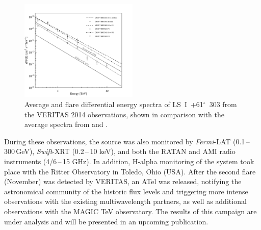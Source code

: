 \documentclass[preprint2]{aastex}
\newcommand{\lsi}{LS~I~+61$^{\circ}$~303}
\newcommand{\gev}{\,GeV}
\begin{document}
\begin{figure}[ht]
\centering
\includegraphics[width=0.5\textwidth]{figs/all_spectra_ED.pdf}
\caption{Average and flare differential energy spectra of \lsi{} from the VERITAS 2014 observations, shown in comparison with the average spectra from \citet{VERITASLSIDetection} and \citet{Aleksic}.}
\label{spec}
\end{figure}

During these observations, the source was also monitored by \emph{Fermi}-LAT (0.1\,--\,300\gev{}), \emph{Swift}-XRT (0.2\,--\,10 keV), and both the RATAN and AMI radio instruments (4/6\,--\,15 GHz). In addition, H-alpha monitoring of the system took place with the Ritter Observatory in Toledo, Ohio (USA). After the second flare (November) was detected by VERITAS, an ATel \citep{2015VTSATEL} was released, notifying the astronomical community of the historic flux levels and triggering more intense observations with the existing multiwavelength partners, as well as additional observations with the MAGIC TeV observatory. The results of this campaign are under analysis and will be presented in an upcoming publication. 
\end{document}
